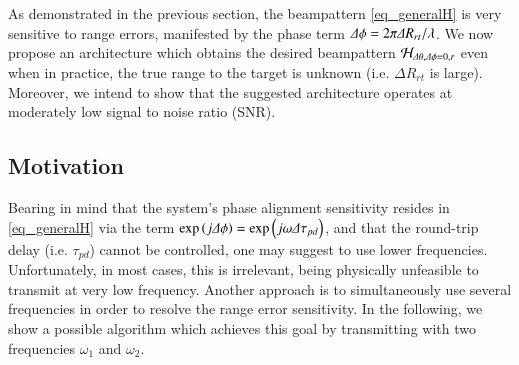 As demonstrated in the previous section, the beampattern \eqref{eq_generalH} is very sensitive to range errors, manifested by the phase term $\Delta\phi=2\pi \Delta R_{rt}/\lambda $. We now propose an architecture which obtains the desired beampattern $\mathcal{H}_{\Delta\theta,\Delta\phi=0,r}$ even when in practice, the true range to the target is unknown (i.e. $\Delta R_{rt}$ is large). Moreover, we intend to show that the suggested architecture operates at moderately low signal to noise ratio (SNR).

\subsection*{Motivation}
Bearing in mind that the system's phase alignment sensitivity resides in \eqref{eq_generalH} via the  term $\exp\left({j\Delta\phi}\right)=\exp\left({j\omega\Delta\tau_{pd}}\right)$, and that the round-trip delay (i.e. $\tau_{pd}$) cannot be controlled, one may suggest to use lower frequencies. Unfortunately, in most cases, this is irrelevant, being physically unfeasible to transmit at very low frequency. Another approach is to simultaneously use several frequencies in order to resolve the range error sensitivity. In the following, we show a possible algorithm which achieves this goal by transmitting with two frequencies $\omega_1$ and $\omega_2$.

